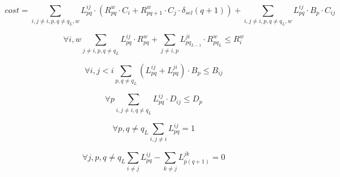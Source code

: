 $$
cost = 
    \sum_{i,j\neq i,p,q \neq q_L,w} {L^{ij}_{pq} \cdot (R^{w}_{pq} \cdot C_{i} + R^{w}_{pq+1} \cdot C_{j} \cdot \delta_{sel}(q+1))} + 
    \sum_{i,j \neq i,p,q \neq q_L,w} L^{ij}_{pq} \cdot B_p \cdot  C_{ij}
$$

$$
\forall i,w 
    \sum_{j \neq i,p,q \neq q_L} L^{ij}_{pq} \cdot R^{w}_{pq} +
    \sum_{j \neq i,p} L^{ji}_{pq_{L-1}} \cdot R^{w}_{pq_L}
    \leq R^{w}_i
$$

$$
    \forall i, j < i \sum_{p,q \neq q_{L}} (L^{ij}_{pq} + L^{ji}_{pq}) \cdot B_p \leq B_{ij}
$$

$$
    \forall{p} \sum_{i,j \neq i,q \neq q_L} L^{ij}_{pq} \cdot D_{ij} \leq D_p 
$$

$$
    \forall{p,q \neq q_L} \sum_{i,j \neq i}  L^{ij}_{pq} = 1
$$

$$
    \forall{j,p,q \neq q_L} \sum_{i \neq j} L^{ij}_{pq} - \sum_{k \neq j} L^{jk}_{p(q+1)} = 0
$$